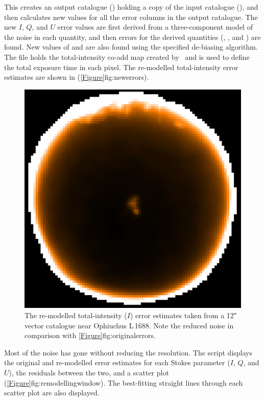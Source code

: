 \begin{terminalv}
\end{terminalv}

This creates an output catalogue () holding a copy of
the input catalogue (), and then calculates new values
for all the error columns in the output catalogue. The new $I$, $Q$,
and $U$ error values are first derived from a three-component model of
the noise in each quantity, and then errors for the derived quantities
(, , and ) are found. New values of
 and  are also found using
the specified de-biasing algorithm. The file  holds the
total-intensity co-add map created by \poltwomap\ and is used to define
the total exposure time in each pixel. The re-modelled total-intensity
error estimates are shown in (\cref{Figure}{fig:newerrors}{}).

\begin{figure}[ht!]
\begin{center}
\includegraphics[width=0.46\linewidth]{sc22-ophl1688-pol2-noise-remod-1.png}
\caption [Remodelled Error Estimates in POL-2 Vector Catalogue for Oph L\,1688]{
  The re-modelled total-intensity ($I$) error estimates taken from a 12\si{\arcsecond}
  vector catalogue near Ophiuchus L\,1688. Note the reduced noise in
  comparison with \cref{Figure}{fig:originalerrors}{}.
\label{fig:newerrors}
}
\end{center}
\end{figure}

Most of the noise has gone without reducing the resolution. The script
displays the original and re-modelled error estimates for each Stokes
parameter ($I$, $Q$, and $U$), the residuals between the two, and a scatter
plot (\cref{Figure}{fig:remodellingwindow}{}). The best-fitting
straight lines through each scatter plot are also displayed.

